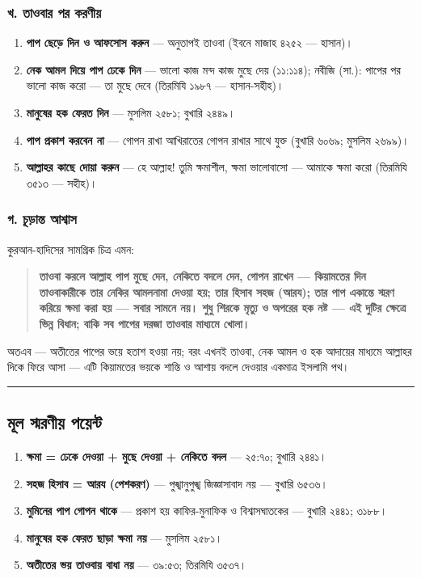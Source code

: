 \subsubsection*{খ. তাওবার পর করণীয়}

\begin{enumerate}
\item \textbf{পাপ ছেড়ে দিন ও আফসোস করুন} — অনুতাপই তাওবা (ইবনে মাজাহ ৪২৫২ — হাসান)।
\item \textbf{নেক আমল দিয়ে পাপ ঢেকে দিন} — ভালো কাজ মন্দ কাজ মুছে দেয় (১১:১১৪); নবীজি (সা.): পাপের পর ভালো কাজ করো — তা মুছে দেবে (তিরমিযি ১৯৮৭ — হাসান-সহীহ)।
\item \textbf{মানুষের হক ফেরত দিন} — মুসলিম ২৫৮১; বুখারি ২৪৪৯।
\item \textbf{পাপ প্রকাশ করবেন না} — গোপন রাখা আখিরাতের গোপন রাখার সাথে যুক্ত (বুখারি ৬০৬৯; মুসলিম ২৬৯৯)।
\item \textbf{আল্লাহর কাছে দোয়া করুন} — হে আল্লাহ! তুমি ক্ষমাশীল, ক্ষমা ভালোবাসো — আমাকে ক্ষমা করো (তিরমিযি ৩৫১৩ — সহীহ)।
\end{enumerate}
\subsubsection*{গ. চূড়ান্ত আশ্বাস}

কুরআন-হাদিসের সামগ্রিক চিত্র এমন:

\begin{quote}
\textbf{তাওবা করলে আল্লাহ পাপ মুছে দেন, নেকিতে বদলে দেন, গোপন রাখেন — কিয়ামতের দিন তাওবাকারীকে তার নেকির আমলনামা দেওয়া হয়; তার হিসাব সহজ (আরয); তার পাপ একান্তে স্মরণ করিয়ে ক্ষমা করা হয় — সবার সামনে নয়। শুধু শিরকে মৃত্যু ও অপরের হক নষ্ট — এই দুটির ক্ষেত্রে ভিন্ন বিধান; বাকি সব পাপের দরজা তাওবার মাধ্যমে খোলা।}
\end{quote}

অতএব — অতীতের পাপের ভয়ে হতাশ হওয়া নয়; বরং এখনই তাওবা, নেক আমল ও হক আদায়ের মাধ্যমে আল্লাহর দিকে ফিরে আসা — এটি কিয়ামতের ভয়কে শান্তি ও আশায় বদলে দেওয়ার একমাত্র ইসলামি পথ।

\medskip\hrule\medskip

\subsection*{মূল স্মরণীয় পয়েন্ট}

\begin{enumerate}
\item \textbf{ক্ষমা = ঢেকে দেওয়া + মুছে দেওয়া + নেকিতে বদল} — ২৫:৭০; বুখারি ২৪৪১।
\item \textbf{সহজ হিসাব = আরয (পেশকরণ)} — পুঙ্খানুপুঙ্খ জিজ্ঞাসাবাদ নয় — বুখারি ৬৫৩৬।
\item \textbf{মুমিনের পাপ গোপন থাকে} — প্রকাশ হয় কাফির-মুনাফিক ও বিশ্বাসঘাতকের — বুখারি ২৪৪১; ৩১৮৮।
\item \textbf{মানুষের হক ফেরত ছাড়া ক্ষমা নয়} — মুসলিম ২৫৮১।
\item \textbf{অতীতের ভয় তাওবায় বাধা নয়} — ৩৯:৫৩; তিরমিযি ৩৫৩৭।
\end{enumerate}


